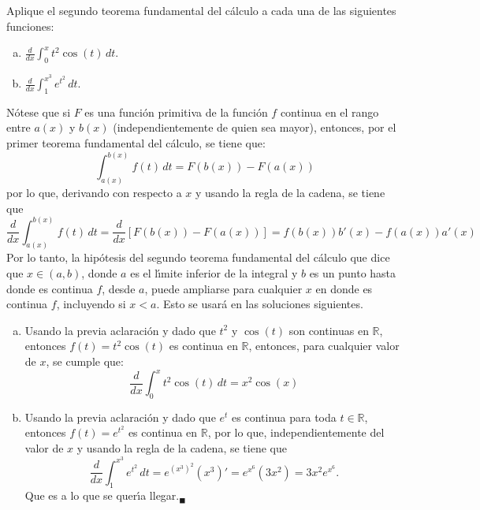 \begin{enunciado}
 Aplique el segundo teorema fundamental del c\'alculo a cada una de las siguientes funciones:
 \par 
 \begin{multicols}{2}
  \begin{enumerate}[(a)]
   \item $\frac{d}{dx} \int_{0}^{x} t^2\cos(t) \, dt$.
   
   \item $\frac{d}{dx} \int_{1}^{x^3} e^{t^2}\, dt$.
  \end{enumerate}
 \end{multicols}
\end{enunciado}

\begin{solucion}
 N\'otese que si $F$ es una funci\'on primitiva de la funci\'on $f$ continua en el rango entre $a(x)$ y $b(x)$ (independientemente de quien sea mayor), entonces, por el primer teorema fundamental del c\'alculo, se tiene que:
 \begin{equation*}
  \int_{a(x)}^{b(x)} f(t) \,dt = F\left( b(x) \right) - F\left( a(x) \right)
 \end{equation*}
 por lo que, derivando con respecto a $x$ y usando la regla de la cadena, se tiene que
 \begin{equation*}
  \frac{d}{dx} \int_{a(x)}^{b(x)} f(t) \,dt = \frac{d}{dx}\left[ F\left( b(x) \right) - F\left( a(x) \right) \right] = f\left( b(x) \right)b'(x) - f\left( a(x) \right) a'(x)
 \end{equation*}
 Por lo tanto, la hip\'otesis del segundo teorema fundamental del c\'alculo que dice que $x\in(a,b)$, donde $a$ es el l\'{\i}mite inferior de la integral y $b$ es un punto hasta donde es continua $f$, desde $a$, puede ampliarse para cualquier $x$ en donde es continua $f$, incluyendo si $x<a$. Esto se usar\'a en las soluciones siguientes.
 \begin{enumerate}[(a)]
  \item Usando la previa aclaraci\'on y dado que $t^2$ y $\cos(t)$ son continuas en $\mathbb{R}$, entonces $f(t) = t^2\cos(t)$ es continua en $\mathbb{R}$, entonces, para cualquier valor de $x$, se cumple que:
  \begin{equation*}
   \frac{d}{dx} \int_0^x t^2 \cos(t)\, dt = x^2\cos(x)
  \end{equation*}
  
  \item Usando la previa aclaraci\'on y dado que $e^t$ es continua para toda $t \in \mathbb{R}$, entonces $f(t) = e^{t^2}$ es continua en $\mathbb{R}$, por lo que, independientemente del valor de $x$ y usando la regla de la cadena, se tiene que
  \begin{equation*}
   \frac{d}{dx} \int_{1}^{x^3} e^{t^2} \, dt = e^{\left( x^3 \right)^2}  \left( x^3 \right)' = e^{x^6} (3x^2) = 3x^2 e^{x^6}.
  \end{equation*}
  Que es a lo que se quer\'{\i}a llegar.${}_{\blacksquare}$
 \end{enumerate}
\end{solucion}
